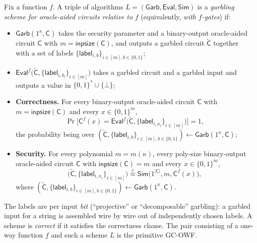 \documentclass{aicr-conjecture}
\newcommand{\bits}{\{0,1\}}
\newcommand{\Cc}{\mathsf{C}}
\newcommand{\Ct}{\widetilde{\mathsf{C}}}
\newcommand{\lab}{\mathsf{label}}
\newcommand{\labset}[1]{\{\lab_{i,#1}\}}
\newcommand{\Garb}{\mathsf{Garb}}
\newcommand{\Evl}{\mathsf{Eval}}
\newcommand{\Sm}{\mathsf{Sim}}
\newcommand{\inpsize}{\mathsf{inpsize}}
\newcommand{\cind}{\stackrel{c}{\approx}}
\newcommand{\GCOWF}{\textup{GC-OWF}}
\begin{document}
\begin{definition}\label{def:garb}
Fix a function $f$. A triple of algorithms $L=(\Garb,\Evl,\Sm)$ is a
\emph{garbling scheme for oracle-aided circuits relative to $f$}
(equivalently, \emph{with $f$-gates}) if:
\begin{itemize}
\item $\Garb(1^{\kappa},\Cc)$ takes the security parameter and a
  binary-output oracle-aided circuit $\Cc$ with $m=\inpsize(\Cc)$, and
  outputs a garbled circuit $\Ct$ together with a set of labels
  $\labset{b}_{i\in[m],b\in\bits}$;
\item $\Evl^{f}\bigl(\Ct,\labset{b_i}_{i\in[m]}\bigr)$ takes a garbled
  circuit and a garbled input and outputs a value in
  $\bits^{*}\cup\{\bot\}$;
\item \textbf{Correctness.} For every binary-output oracle-aided circuit
  $\Cc$ with $m=\inpsize(\Cc)$ and every $x\in\bits^{m}$,
  \[
    \Pr\bigl[\Cc^{f}(x)=
      \Evl^{f}\bigl(\Ct,\labset{x_i}_{i\in[m]}\bigr)\bigr]=1,
  \]
  the probability being over
  $(\Ct,\labset{b}_{i\in[m],b\in\bits})\leftarrow\Garb(1^{\kappa},\Cc)$;
\item \textbf{Security.} For every polynomial $m=m(\kappa)$, every
  poly-size binary-output oracle-aided circuit $\Cc$ with
  $\inpsize(\Cc)=m$ and every $x\in\bits^{m}$,
  \[
    \bigl(\Ct,\labset{x_i}_{i\in[m]}\bigr)\cind
      \Sm\bigl(1^{|\Cc|},m,\Cc^{f}(x)\bigr),
  \]
  where
  $(\Ct,\labset{b}_{i\in[m],b\in\bits})\leftarrow\Garb(1^{\kappa},\Cc)$.
\end{itemize}
The labels are per input \emph{bit} (``projective'' or ``decomposable''
garbling): a garbled input for a string is assembled wire by wire out of
independently chosen labels. A scheme is \emph{correct} if it satisfies
the correctness clause. The pair consisting of a one-way function $f$ and
such a scheme $L$ is the primitive \GCOWF{}.
\end{definition}
\end{document}
